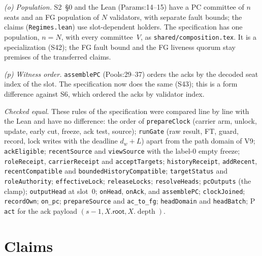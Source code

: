 \documentclass{article}
\newcommand{\depth}{\operatorname{depth}}
\newcommand{\nm}[1]{\nolinkurl{#1}}
\begin{document}
\emph{(o) Population.}  S2~\S0 and the Lean (Params:14--15) have a PC
committee of $n$ seats and an FG population of $N$ validators, with
separate fault bounds; the claims (\nm{Regimes.lean}) use slot-dependent
holders.  The specification has one population, $n=N$, with every
committee~$V$, as \nm{shared/composition.tex}.  It is a specialization
(S42); the FG fault bound and the FG liveness quorum stay premises of the
transferred claims.

\emph{(p) Witness order.}  \nm{assemblePC} (Pools:29--37) orders the
acks by the decoded seat index of the slot.  The specification now does
the same (S43); this is a form difference against S6, which ordered the
acks by validator index.

\emph{Checked equal.}  These rules of the specification were compared
line by line with the Lean and have no difference: the order of
\nm{prepareClock} (carrier arm, unlock, update, early cut, freeze, ack
test, source); \nm{runGate} (raw result, FT, guard, record, lock writes
with the deadline $d_w+L$) apart from the path domain of V9;
\nm{ackEligible};
\nm{recentSource} and \nm{viewSource} with the label-0 empty freeze;
\nm{roleReceipt}, \nm{carrierReceipt} and \nm{acceptTargets};
\nm{historyReceipt}, \nm{addRecent}, \nm{recentCompatible} and
\nm{boundedHistoryCompatible}; \nm{targetStatus} and \nm{roleAuthority};
\nm{effectiveLock}; \nm{releaseLocks}; \nm{resolveHeads}; \nm{pcOutputs} (the clamp);
\nm{outputHead} at slot~0; \nm{onHead}, \nm{onAck}, and \nm{assemblePC};
\nm{clockJoined}; \nm{recordOwn};
\nm{on\_pc}; \nm{prepareSource} and \nm{ac\_to\_fg}; \nm{headDomain} and
\nm{headBatch}; P \nm{act} for the ack payload $(s-1,X.\mathsf{root},
X.\depth)$.

\section{Claims}\label{sec:claims}
\end{document}
